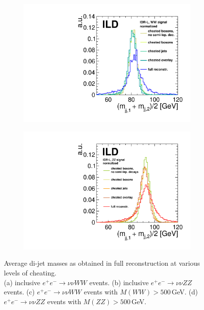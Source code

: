 \begin{figure}[htbp]
\begin{center}
\begin{subfigure}{0.495\hsize} \includegraphics[width=\textwidth]{Performance/fig/l_WW_cheating_steps_highQ2.pdf}
 \caption{ \label{fig:qgc:cheat:WWQ2}}
 \end{subfigure}
\begin{subfigure}{0.495\hsize} \includegraphics[width=\textwidth]{Performance/fig/l_ZZ_cheating_steps_highQ2.pdf}
 \caption{  \label{fig:qgc:cheat:ZZQ2}}
 \end{subfigure}
\end{center}
\caption{Average di-jet masses as obtained in full reconstruction at various levels of cheating.\\
(a) inclusive $e^+e^- \to \nu\nu WW$ events. 
(b) inclusive $e^+e^- \to \nu\nu ZZ$ events.
(c)  $e^+e^- \to \nu\nu WW$ events with $M(WW)>500$\,GeV. 
(d)  $e^+e^- \to \nu\nu ZZ$ events with $M(ZZ)>500$\,GeV.\\
}
\label{fig:qgc:cheatWWZZ}
\end{figure}

